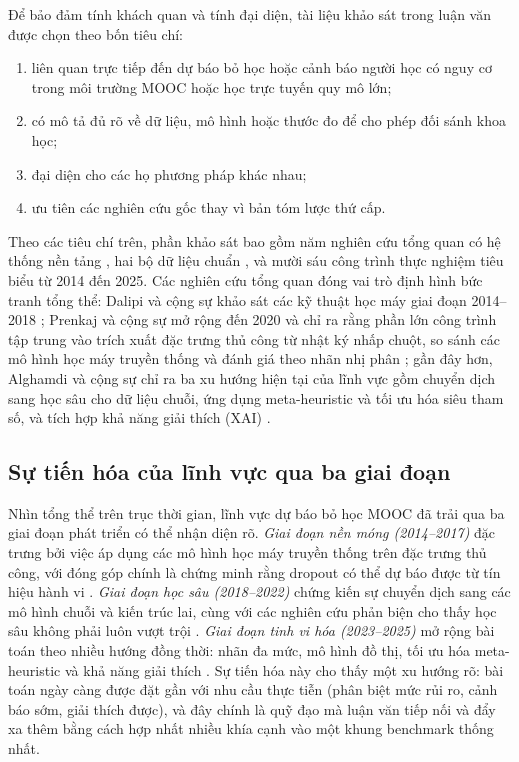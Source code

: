 Để bảo đảm tính khách quan và tính đại diện, tài liệu khảo sát trong luận văn được chọn theo bốn tiêu chí:

\begin{enumerate}[label=(\roman*),leftmargin=1.2cm,topsep=3pt]
  \item liên quan trực tiếp đến dự báo bỏ học hoặc cảnh báo người học có nguy cơ trong môi trường MOOC hoặc học trực tuyến quy mô lớn;
  \item có mô tả đủ rõ về dữ liệu, mô hình hoặc thước đo để cho phép đối sánh khoa học;
  \item đại diện cho các họ phương pháp khác nhau;
  \item ưu tiên các nghiên cứu gốc thay vì bản tóm lược thứ cấp.
\end{enumerate}

Theo các tiêu chí trên, phần khảo sát bao gồm năm nghiên cứu tổng quan có hệ thống nền tảng \cite{Dalipi2018,Prenkaj2020,Alghamdi2025,Deng2022,deFreitas2015}, hai bộ dữ liệu chuẩn \cite{Yu2021,Kuzilek2017}, và mười sáu công trình thực nghiệm tiêu biểu từ 2014 đến 2025. Các nghiên cứu tổng quan đóng vai trò định hình bức tranh tổng thể: Dalipi và cộng sự khảo sát các kỹ thuật học máy giai đoạn 2014--2018 \cite{Dalipi2018}; Prenkaj và cộng sự mở rộng đến 2020 và chỉ ra rằng phần lớn công trình tập trung vào trích xuất đặc trưng thủ công từ nhật ký nhấp chuột, so sánh các mô hình học máy truyền thống và đánh giá theo nhãn nhị phân \cite{Prenkaj2020}; gần đây hơn, Alghamdi và cộng sự chỉ ra ba xu hướng hiện tại của lĩnh vực gồm chuyển dịch sang học sâu cho dữ liệu chuỗi, ứng dụng meta-heuristic và tối ưu hóa siêu tham số, và tích hợp khả năng giải thích (XAI) \cite{Alghamdi2025}.

\subsection{Sự tiến hóa của lĩnh vực qua ba giai đoạn}

Nhìn tổng thể trên trục thời gian, lĩnh vực dự báo bỏ học MOOC đã trải qua ba giai đoạn phát triển có thể nhận diện rõ. \textit{Giai đoạn nền móng (2014--2017)} đặc trưng bởi việc áp dụng các mô hình học máy truyền thống trên đặc trưng thủ công, với đóng góp chính là chứng minh rằng dropout có thể dự báo được từ tín hiệu hành vi \cite{Kloft2014,Taylor2014,Fei2015,Whitehill2017}. \textit{Giai đoạn học sâu (2018--2022)} chứng kiến sự chuyển dịch sang các mô hình chuỗi và kiến trúc lai, cùng với các nghiên cứu phản biện cho thấy học sâu không phải luôn vượt trội \cite{Xing2019,Mubarak2021,Fu2021,Basnet2022}. \textit{Giai đoạn tinh vi hóa (2023--2025)} mở rộng bài toán theo nhiều hướng đồng thời: nhãn đa mức, mô hình đồ thị, tối ưu hóa meta-heuristic và khả năng giải thích \cite{Martins2023,Junejo2025,Aouarib2025,Nguyen2025,Bettahi2025}. Sự tiến hóa này cho thấy một xu hướng rõ: bài toán ngày càng được đặt gần với nhu cầu thực tiễn (phân biệt mức rủi ro, cảnh báo sớm, giải thích được), và đây chính là quỹ đạo mà luận văn tiếp nối và đẩy xa thêm bằng cách hợp nhất nhiều khía cạnh vào một khung benchmark thống nhất.

